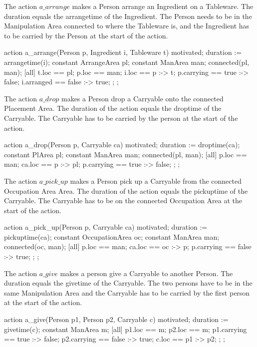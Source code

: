 The action $a\_arrange$ makes a Person arrange an Ingredient on a Tableware.
The duration equals the arrangetime of the Ingredient.
The Person needs to be in the Manipulation Area connected to where the Tableware is, and the Ingredient has to be carried by the Person at the start of the action.

\begin{anmlcode}
action a_arrange(Person p, Ingredient i, Tableware t) {
  motivated;
  duration := arrangetime(i);
  constant ArrangeArea pl;
  constant ManArea man;
  connected(pl, man);
  [all] {
    t.loc == pl;
    p.loc == man;
    i.loc == p :-> t;
    p.carrying == true :-> false;
    i.arranged == false :-> true;
  };
};
\end{anmlcode}

The action $a\_drop$ makes a Person drop a Carryable onto the connected Placement Area.
The duration of the action equals the droptime of the Carryable.
The Carryable has to be carried by the person at the start of the action.

\begin{anmlcode}
action a_drop(Person p, Carryable ca) {
  motivated;
  duration := droptime(ca);
  constant PlArea pl;
  constant ManArea man;
  connected(pl, man);
  [all] {
    p.loc == man;
    ca.loc == p :-> pl;
    p.carrying == true :-> false;
  };
};
\end{anmlcode}

The action $a\_pick\_up$ makes a Person pick up a Carryable from the connected Occupation Area Area.
The duration of the action equals the pickuptime of the Carryable.
The Carryable has to be on the connected Occupation Area at the start of the action.

\begin{anmlcode}
action a_pick_up(Person p, Carryable ca) {
  motivated;
  duration := pickuptime(ca);
  constant OccupationArea oc;
  constant ManArea man;
  connected(oc, man);
  [all] {
    p.loc == man;
    ca.loc == oc :-> p; 
    p.carrying == false :-> true;
  };
};
\end{anmlcode}

The action $a\_give$ makes a person give a Carryable to another Person.
The duration equals the givetime of the Carryable.
The two persons have to be in the same Manipulation Area and the Carryable has to be carried by the first person at the start of the action.

\begin{anmlcode}
action a_give(Person p1, Person p2, Carryable c) {
  motivated;
  duration := givetime(c);
  constant ManArea m;
  [all] {
    p1.loc == m;
    p2.loc == m;
    p1.carrying == true :-> false;
    p2.carrying == false :-> true;
    c.loc == p1 :-> p2;
  };
};
\end{anmlcode}


